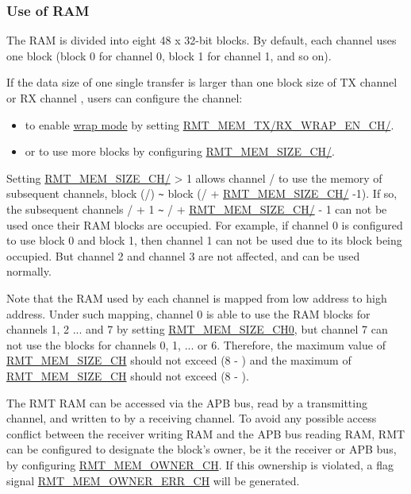 \documentclass[main\_\_EN.tex]{subfiles}
\begin{document}
\subsubsection{Use of RAM}

The RAM is divided into eight 48 x 32-bit blocks. By default, each channel uses one block (block 0 for channel 0, block 1 for channel 1, and so on).

If the data size of one single transfer is larger than one block size of TX channel  or RX channel , users can configure the channel:
\begin{itemize}
    \item to enable \hyperref[sec:wrap-tx-mode]{wrap mode} by setting \hyperref[fielddesc:RMTMEMTXWRAPENCHN]{RMT\_MEM\_TX/RX\_WRAP\_EN\_CH/}.
    \item or to use more blocks by configuring \hyperref[fielddesc:RMTMEMSIZECHN]{RMT\_MEM\_SIZE\_CH/}.
\end{itemize}

Setting \hyperref[fielddesc:RMTMEMSIZECHN]{RMT\_MEM\_SIZE\_CH/} > 1 allows channel / to use the memory of subsequent channels, block (/) \verb+~+ block (/ + \hyperref[fielddesc:RMTMEMSIZECHN]{RMT\_MEM\_SIZE\_CH/} -1). If so, the subsequent channels  / + 1 \verb+~+ / + \hyperref[fielddesc:RMTMEMSIZECHN]{RMT\_MEM\_SIZE\_CH/} - 1 can not be used once their RAM blocks are occupied. For example, if channel 0 is configured to use block 0 and block 1, then channel 1 can not be used due to its block being occupied. But channel 2 and channel 3 are not affected, and can be used normally.


Note that the RAM used by each channel is mapped from low address to high address. Under such mapping, channel 0 is able to use the RAM blocks for channels 1, 2 ... and 7 by setting \hyperref[fielddesc:RMTMEMSIZECHN]{RMT\_MEM\_SIZE\_CH0}, but channel 7 can not use the blocks for channels 0, 1, ... or 6. Therefore, the maximum value of \hyperref[fielddesc:RMTMEMSIZECHN]{RMT\_MEM\_SIZE\_CH} should not exceed (8 - ) and the maximum of \hyperref[fielddesc:RMTMEMSIZECHN]{RMT\_MEM\_SIZE\_CH} should not exceed (8 - ).

The RMT RAM can be accessed via the APB bus, read by a transmitting channel, and written to by a receiving channel. To avoid any possible access conflict between the receiver writing RAM and the APB bus reading RAM, RMT can be configured to designate the block's owner, be it the receiver or APB bus, by configuring \hyperref[fielddesc:RMTMEMOWNERCHM]{RMT\_MEM\_OWNER\_CH}. If this ownership is violated, a flag signal \hyperref[fielddesc:RMTMEMOWNERERRCHM]{RMT\_MEM\_OWNER\_ERR\_CH} will be generated.
\end{document}
